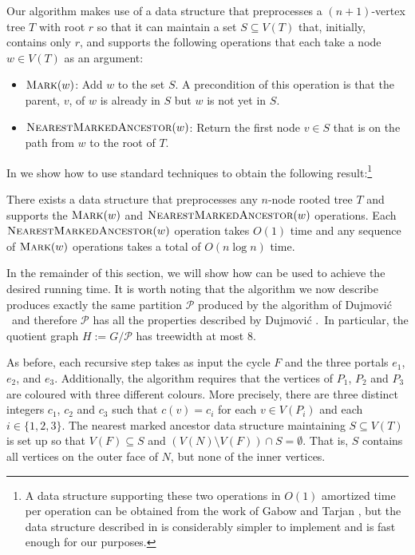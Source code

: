 \documentclass[kpfonts]{patmorin}
\begin{document}
Our algorithm makes use of a data structure that preprocesses a $(n+1)$-vertex tree $T$ with root $r$ so that it can maintain a set $S\subseteq V(T)$ that, initially, contains only $r$, and supports the following operations that each take a node $w\in V(T)$ as an argument:

\begin{itemize}
    \item $\textsc{Mark}(w)$: Add $w$ to the set $S$.  A precondition of this operation is that the parent, $v$, of $w$ is already in $S$ but $w$ is not yet in $S$.

    \item $\textsc{NearestMarkedAncestor}(w)$:  Return the first node $v\in S$ that is on the path from $w$ to the root of $T$.
\end{itemize}

In  we show how to use standard techniques to obtain the following result:\footnote{A data structure supporting these two operations in $O(1)$ amortized time per operation can be obtained from the work of Gabow and Tarjan \cite{gabow.tarjan:linear}, but the data structure described in  is considerably simpler to implement and is fast enough for our purposes.}

\begin{lem}
    There exists a data structure that preprocesses any $n$-node rooted tree $T$ and supports the $\textsc{Mark}(w)$ and $\textsc{NearestMarkedAncestor}(w)$ operations. Each $\textsc{NearestMarkedAncestor}(w)$ operation takes $O(1)$ time and any sequence of $\textsc{Mark}(w)$ operations takes a total of $O(n\log n)$ time.
\end{lem}

In the remainder of this section, we will show how  can be used to achieve the desired running time.  It is worth noting that the algorithm we now describe produces exactly the same partition $\mathcal{P}$ produced by the algorithm of Dujmović \etal\ and therefore $\mathcal{P}$ has all the properties described by Dujmović \etal.\  In particular, the quotient graph $H:=G/\mathcal{P}$ has treewidth at most $8$.

As before, each recursive step takes as input the cycle $F$ and the three portals $e_1$, $e_2$, and $e_3$.  Additionally, the algorithm requires that the vertices of $P_1$, $P_2$ and $P_3$ are coloured with three different colours.  More precisely, there are three distinct integers $c_1$, $c_2$ and $c_3$ such that $c(v)=c_i$ for each $v\in V(P_i)$ and each $i\in\{1,2,3\}$.  The nearest marked ancestor data structure maintaining $S\subseteq V(T)$ is set up so that $V(F)\subseteq S$ and $(V(N)\setminus V(F))\cap S=\emptyset$.  That is, $S$ contains all vertices on the outer face of $N$, but none of the inner vertices.
\end{document}
